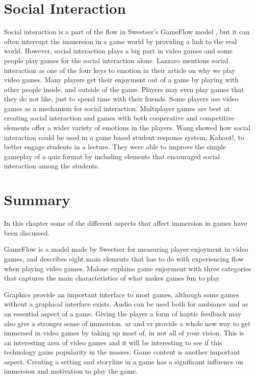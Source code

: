 \section{Social Interaction}
Social interaction is a part of the flow in Sweetser's GameFlow model \cite{sweetser2005gameflow}, but it can often interrupt the immersion in a game world by providing a link to the real world. However, social interaction plays a big part in video games and some people play games for the social interaction alone. Lazzaro \cite{lazzaro2004we} mentions social interaction as one of the four keys to emotion in their article on why we play video games. Many players get their enjoyment out of a game by playing with other people inside, and outside of the game. Players may even play games that they do not like, just to spend time with their friends. Some players use video games as a mechanism for social interaction. Multiplayer games are best at creating social interaction and games with both cooperative and competitive elements offer a wider variety of emotions in the players. Wang \cite{wang2015wear} showed how social interaction could be used in a game based student response system, Kahoot!, to better engage students in a lecture. They were able to improve the simple gameplay of a quiz format by including elements that encouraged social interaction among the students.


\section{Summary}
In this chapter some of the different aspects that affect immersion in games have been discussed.

GameFlow is a model made by Sweetser \cite{sweetser2005gameflow} for measuring player enjoyment in video games, and describes eight main elements that has to do with experiencing flow when playing video games. Malone \cite{malone1980makes} explains game enjoyment with three categories that captures the main characteristics of what makes games fun to play. 

Graphics provide an important interface to most games, although some games without a graphical interface exists.
Audio can be used both for ambiance and as an essential aspect of a game.
Giving the player a form of haptic feedback may also give a stronger sense of immersion. \gls{ar} and \gls{vr} provide a whole new way to get immersed in video games by taking up most of, in not all of your vision. This is an interesting area of video games and it will be interesting to see if this technology gains popularity in the masses. Game content is another important aspect. Creating a setting and storyline in a game has a significant influence on immersion and motivation to play the game.

